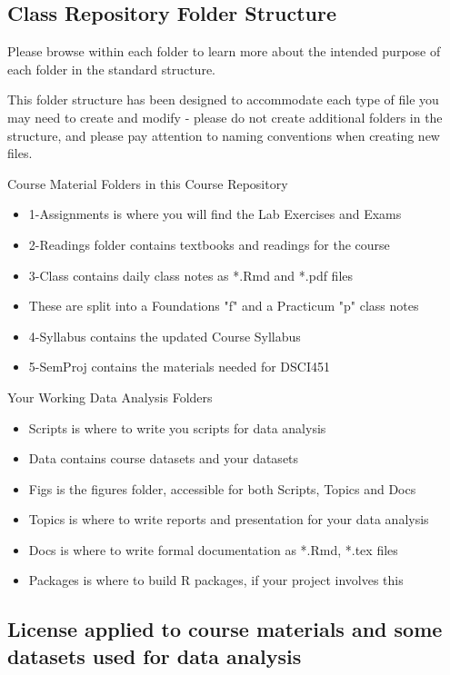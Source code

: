 \documentclass[10pt]{article} %
\begin{document}
  \subsection{Class Repository Folder Structure}

    Please browse within each folder to learn more about the intended purpose of each folder in the standard structure.

    This folder structure has been designed to accommodate each type of file you may need to create and modify - please do not create additional folders in the structure, and please pay attention to naming conventions when creating new files.

    Course Material Folders in this Course Repository
    \begin{itemize}
      \item 1-Assignments is where you will find the Lab Exercises and Exams
      \item 2-Readings folder contains textbooks and readings for the course
      \item 3-Class contains daily class notes as *.Rmd and *.pdf files
      \item These are split into a Foundations "f" and a Practicum "p" class notes
      \item 4-Syllabus contains the updated Course Syllabus
      \item 5-SemProj contains the materials needed for DSCI451
    \end{itemize}

    Your Working Data Analysis Folders
    \begin{itemize}
      \item Scripts is where to write you scripts for data analysis
      \item Data contains course datasets and your datasets
      \item Figs is the figures folder, accessible for both Scripts, Topics and Docs
      \item Topics is where to write reports and presentation for your data analysis
      \item Docs is where to write formal documentation as *.Rmd, *.tex files
      \item Packages is where to build R packages, if your project involves this
    \end{itemize}

  \subsection{License applied to course materials and some datasets used for data analysis}
\end{document}
